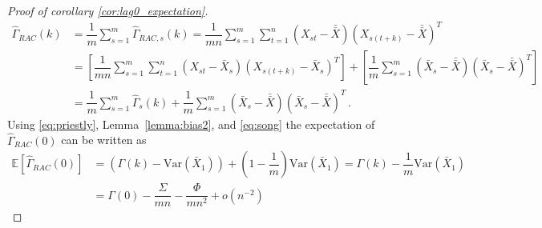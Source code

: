 \documentclass[12pt]{article}
\newcommand{\Var}{\text{Var}}
\theoremstyle{remark}
\begin{document}
\begin{proof}[Proof of corollary \ref{cor:lag0_expectation}]

\begin{align*}
    \hat{\Gamma}_{RAC}(k) &= \dfrac{1}{m}\sum_{s=1}^{m}\hat{\Gamma}_{RAC,s}(k) = \dfrac{1}{mn}\sum_{s=1}^{m}\sum_{t=1}^{n}  \left(X_{st} - \bar{\bar{X}}\right)  \left(X_{s(t+k)} - \bar{\bar{X}}\right)^T\\
    &= \left[\dfrac{1}{mn}\sum_{s=1}^{m}\sum_{t=1}^{n} \left(X_{st} - \bar{X}_s \right)  \left(X_{s(t+k)} - \bar{X}_s \right)^T\right] + \left[\dfrac{1}{m}\sum_{s=1}^{m} \left(\bar{X}_s - \bar{\bar{X}} \right) \left(\bar{X}_s - \bar{\bar{X}} \right)^T\right]\\
    &= \dfrac{1}{m}\sum_{s=1}^{m}\hat{\Gamma}_s(k)  + \dfrac{1}{m}\sum_{s=1}^{m} \left(\bar{X}_s - \bar{\bar{X}} \right)  \left(\bar{X}_s - \bar{\bar{X}} \right)^T\,.
\end{align*}
Using \eqref{eq:priestly}, Lemma~\ref{lemma:bias2}, and \eqref{eq:song} the expectation of $\hat{\Gamma}_{RAC}(0)$ can be written as 
%
\begin{align*}
    \mathbb{E} \left[\hat{\Gamma}_{RAC}(0) \right] &= \left(\Gamma(k) - \Var(\bar{X}_1)\right) + \left(1-\dfrac{1}{m}\right)\Var(\bar{X}_1) = \Gamma(k) - \dfrac{1}{m}\Var(\bar{X}_1)\\
    &= \Gamma(0) - \dfrac{\Sigma}{mn} - \dfrac{\Phi}{mn^2} + o(n^{-2})
\end{align*}

\end{proof}
\end{document}
